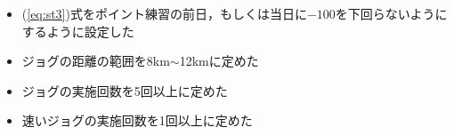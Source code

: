 \documentclass[12pt]{jarticle}
\begin{document}


\begin{itemize}
  \item (\ref{eq:st3})式をポイント練習の前日，もしくは当日に$-100$を下回らないようにするように設定した
  \item ジョグの距離の範囲を8km$\sim$12kmに定めた
  \item ジョグの実施回数を5回以上に定めた
  \item 速いジョグの実施回数を1回以上に定めた

\end{itemize}
\end{document}
